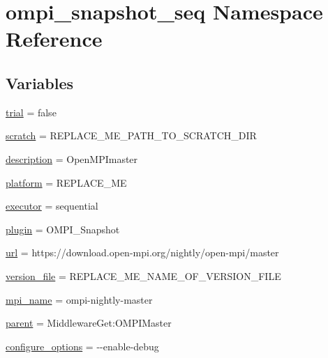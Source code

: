 \hypertarget{namespaceompi__snapshot__seq}{\section{ompi\-\_\-snapshot\-\_\-seq Namespace Reference}
\label{namespaceompi__snapshot__seq}
}
\subsection*{Variables}
\begin{DoxyCompactItemize}
\item 
\hyperlink{namespaceompi__snapshot__seq_a10070286ec527c9dfed8c210ca3917d7}{trial} = false
\item 
\hyperlink{namespaceompi__snapshot__seq_a8855b0a58b147479b623ede37dab8378}{scratch} = R\-E\-P\-L\-A\-C\-E\-\_\-\-M\-E\-\_\-\-P\-A\-T\-H\-\_\-\-T\-O\-\_\-\-S\-C\-R\-A\-T\-C\-H\-\_\-\-D\-I\-R
\item 
\hyperlink{namespaceompi__snapshot__seq_a918891e52aa1a572f039326981585a7a}{description} = Open\-M\-P\-Imaster
\item 
\hyperlink{namespaceompi__snapshot__seq_a300d0cc664225df572aad2518569d7bf}{platform} = R\-E\-P\-L\-A\-C\-E\-\_\-\-M\-E
\item 
\hyperlink{namespaceompi__snapshot__seq_a6293c71d0991763a4bad8b010e0e6ce2}{executor} = sequential
\item 
\hyperlink{namespaceompi__snapshot__seq_a4964274b9eb87e06a95ee1bef66604ef}{plugin} = O\-M\-P\-I\-\_\-\-Snapshot
\item 
\hyperlink{namespaceompi__snapshot__seq_a0af6b7793981b72fee25ffd1d077fd86}{url} = https\-://download.\-open-\/mpi.\-org/nightly/open-\/mpi/master
\item 
\hyperlink{namespaceompi__snapshot__seq_ab1bd70042bbcbfc640abba12010ed2b5}{version\-\_\-file} = R\-E\-P\-L\-A\-C\-E\-\_\-\-M\-E\-\_\-\-N\-A\-M\-E\-\_\-\-O\-F\-\_\-\-V\-E\-R\-S\-I\-O\-N\-\_\-\-F\-I\-L\-E
\item 
\hyperlink{namespaceompi__snapshot__seq_a464fbb2313394347fa064032378c5674}{mpi\-\_\-name} = ompi-\/nightly-\/master
\item 
\hyperlink{namespaceompi__snapshot__seq_a08a86b12770df9f65150ce521c8820b6}{parent} = Middleware\-Get\-:\-O\-M\-P\-I\-Master
\item 
\hyperlink{namespaceompi__snapshot__seq_affb396ef384900a98c5a943dd8817711}{configure\-\_\-options} = -\/-\/enable-\/debug
\item 

\end{DoxyCompactItemize}
